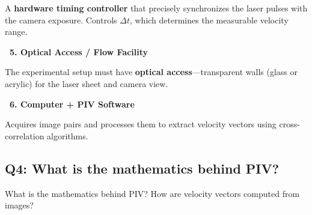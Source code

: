 \documentclass[12pt,a4paper]{article}
\begin{document}
\begin{answerbox}
A \textbf{hardware timing controller} that precisely synchronizes the laser pulses with the camera exposure. Controls $\Delta t$, which determines the measurable velocity range.

\vspace{0.5em}
\textbf{\color{deepblue}~5. Optical Access / Flow Facility}

The experimental setup must have \textbf{optical access}---transparent walls (glass or acrylic) for the laser sheet and camera view.

\vspace{0.5em}
\textbf{\color{deepblue}~6. Computer + PIV Software}

Acquires image pairs and processes them to extract velocity vectors using cross-correlation algorithms.
\end{answerbox}

\subsection{Q4: What is the mathematics behind PIV?}

\begin{questionbox}
What is the mathematics behind PIV? How are velocity vectors computed from images?
\end{questionbox}
\end{document}
